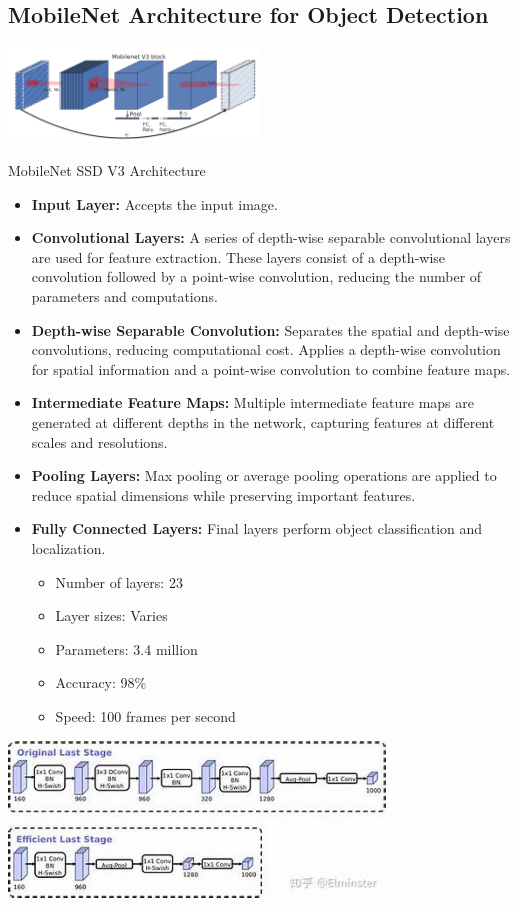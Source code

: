\documentclass[a4paper,12pt,oneside]{book}
\begin{document}
\subsection{MobileNet Architecture for Object Detection}
\begin{center}
    \centering
    \includegraphics[width=0.5\textwidth]{architect.png}
    
\end{center}
\centering
MobileNet SSD V3 Architecture

    


\begin{itemize}
    \item \textbf{Input Layer:} Accepts the input image.
    \item \textbf{Convolutional Layers:} A series of depth-wise separable convolutional layers are used for feature extraction. These layers consist of a depth-wise convolution followed by a point-wise convolution, reducing the number of parameters and computations.
    \item \textbf{Depth-wise Separable Convolution:} Separates the spatial and depth-wise convolutions, reducing computational cost. Applies a depth-wise convolution for spatial information and a point-wise convolution to combine feature maps.
    \item \textbf{Intermediate Feature Maps:} Multiple intermediate feature maps are generated at different depths in the network, capturing features at different scales and resolutions.
    \item \textbf{Pooling Layers:} Max pooling or average pooling operations are applied to reduce spatial dimensions while preserving important features.
    \item \textbf{Fully Connected Layers:} Final layers perform object classification and localization.
    \begin{itemize}
    \item Number of layers: 23
    \item Layer sizes: Varies
    \item Parameters: 3.4 million
    \item Accuracy: 98\%
    \item Speed: 100 frames per second
    \end{itemize}
\end{itemize}
\begin{center}
    \centering
    \includegraphics[width=0.75\textwidth]{new architecure mobile.jpeg}
    
\end{center}
\end{document}
